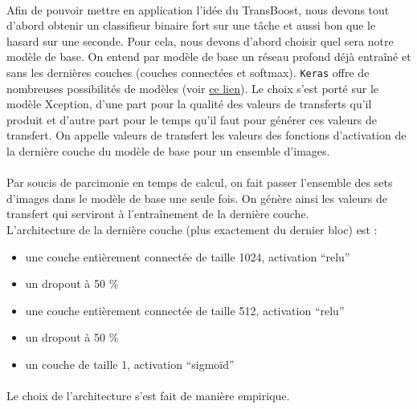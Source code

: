 \documentclass[11 pt]{article}
\begin{document}
\paragraph{}Afin de pouvoir mettre en application l’idée du TransBoost, nous devons tout d’abord obtenir un classifieur binaire fort sur une tâche et aussi bon que le hasard sur une seconde. Pour cela, nous devons d’abord choisir quel sera notre modèle de base. On entend par modèle de base un réseau profond déjà entraîné et sans les dernières couches (couches connectées et softmax). \texttt{Keras} offre de nombreuses possibilités de modèles (voir \href{https://\texttt{Keras}.io/applications/}{ce lien}). Le choix s’est porté sur le modèle Xception, d’une part pour la qualité des valeurs de transferts qu’il produit et d’autre part pour le temps qu’il faut pour générer ces valeurs de transfert. On appelle valeurs de transfert les valeurs des fonctions d’activation de la dernière couche du modèle de base pour un ensemble d’images.

\paragraph{}Par soucis de parcimonie en temps de calcul, on fait passer l’ensemble des sets d’images dans le modèle de base une seule fois. On génère ainsi les valeurs de transfert qui serviront à l’entraînement de la dernière couche. \\
L’architecture de la dernière couche (plus exactement du dernier bloc) est :\\ \medskip
\begin{samepage}
  \begin{itemize}
    \item une couche entièrement connectée de taille 1024, activation “relu”
    \nopagebreak
    \item un dropout à 50 \%
    \nopagebreak
    \item une couche entièrement connectée de taille 512, activation “relu”
    \nopagebreak
    \item un dropout à 50 \%
    \nopagebreak
    \item un couche de taille 1, activation “sigmoïd”
  \end{itemize}
\end{samepage}

\medskip

\paragraph{}Le choix de l'architecture s’est fait de manière empirique.\\
\end{document}
